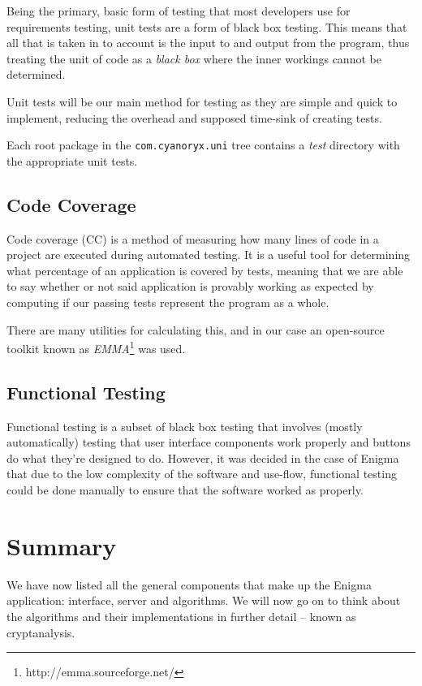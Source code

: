 Being the primary, basic form of testing that most developers use for requirements testing, unit tests are a form of black box testing. This means that all that is taken in to account is the input to and output from the program, thus treating the unit of code as a \emph{black box} where the inner workings cannot be determined. 

Unit tests will be our main method for testing as they are simple and quick to implement, reducing the overhead and supposed time-sink of creating tests.

Each root package in the \verb!com.cyanoryx.uni! tree contains a \emph{test} directory with the appropriate unit tests.

\subsection{Code Coverage}

Code coverage (CC) is a method of measuring how many lines of code in a project are executed during automated testing. It is a useful tool for determining what percentage of an application is covered by tests, meaning that we are able to say whether or not said application is provably working as expected by computing if our passing tests represent the program as a whole.

There are many utilities for calculating this, and in our case an open-source toolkit known as \emph{EMMA}\footnote{http://emma.sourceforge.net/} was used.

\subsection{Functional Testing}

Functional testing is a subset of black box testing that involves (mostly automatically) testing that user interface components work properly and buttons do what they're designed to do. However, it was decided in the case of Enigma that due to the low complexity of the software and use-flow, functional testing could be done manually to ensure that the software worked as properly.

\section{Summary}

We have now listed all the general components that make up the Enigma application: interface, server and algorithms. We will now go on to think about the algorithms and their implementations in further detail -- known as cryptanalysis.

